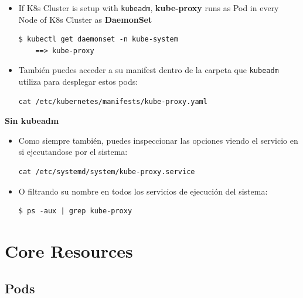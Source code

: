 \documentclass{article}
\newenvironment{codetemplate}[1][]{%
  \mybasecolorbox[#1]
  \itshape
}{%
  \endmybasecolorbox
}
\begin{document}
\begin{itemize}
    \item If K8s Cluster is setup with \verb|kubeadm|, \textbf{kube-proxy} runs as Pod in every Node of K8s Cluster as \textbf{DaemonSet}
\begin{codetemplate}{}
\begin{verbatim}
$ kubectl get daemonset -n kube-system
    ==> kube-proxy
\end{verbatim}
\end{codetemplate}

    \item También puedes acceder a su manifest dentro de la carpeta que \verb|kubeadm| utiliza para desplegar estos pods:
\begin{codetemplate}{}
\begin{verbatim}
cat /etc/kubernetes/manifests/kube-proxy.yaml
\end{verbatim}
\end{codetemplate}
\end{itemize}

\textbf{Sin kubeadm}

\begin{itemize}
    \item Como siempre también, puedes inspeccionar las opciones viendo el servicio en si ejecutandose por el sistema:
\begin{codetemplate}{}
\begin{verbatim}
cat /etc/systemd/system/kube-proxy.service
\end{verbatim}
\end{codetemplate}

    \item O filtrando su nombre en todos los servicios de ejecución del sistema:
\begin{codetemplate}{}
\begin{verbatim}
$ ps -aux | grep kube-proxy
\end{verbatim}
\end{codetemplate}
\end{itemize}

\newpage
\section{Core Resources}
\subsection{Pods}
\end{document}
